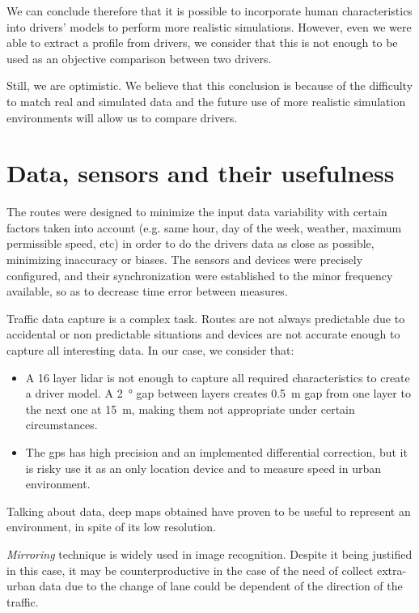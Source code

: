 We can conclude therefore that it is possible to incorporate human characteristics into drivers’ models to perform more realistic simulations. However, even we were able to extract a profile from drivers, we consider that this is not enough to be used as an objective comparison between two drivers.

Still, we are optimistic. We believe that this conclusion is because of the difficulty to match real and simulated data and the future use of more realistic simulation environments will allow us to compare drivers.

\section{Data, sensors and their usefulness}

The routes were designed to minimize the input data variability with certain factors taken into account (e.g. same hour, day of the week, weather, maximum permissible speed, etc) in order to do the drivers data as close as possible, minimizing inaccuracy or biases. The sensors and devices were precisely configured, and their synchronization were established to the minor frequency available, so as to decrease time error between measures.

Traffic data capture is a complex task. Routes are not always predictable due to accidental or non predictable situations and devices are not accurate enough to capture all interesting data. In our case, we consider that:


\begin{itemize}
	\item A 16 layer \acrshort{lidar} is not enough to capture all required characteristics to create a driver model. A \SI{2}{\degree} gap between layers creates \SI{0.5}{\meter} gap from one layer to the next one at \SI{15}{\meter}, making them not appropriate under certain circumstances.
	\item The \acrshort{gps} has high precision and an implemented differential correction, but it is risky use it as an only location device and to measure speed in urban environment.
\end{itemize}

Talking about data, deep maps obtained have proven to be useful to represent an environment, in spite of its low resolution.

\textit{Mirroring} technique is widely used in image recognition. Despite it being justified in this case, it may be counterproductive in the case of the need of collect extra-urban data due to the change of lane could be dependent of the direction of the traffic.


